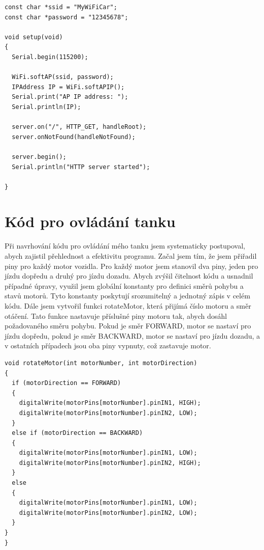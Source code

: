 \documentclass[12pt, a4paper,
oneside
openany
]{report}
\begin{document}
	\vspace*{0.1\textheight}

 \begin{lstlisting}[style=arduinoStyle]
const char *ssid = "MyWiFiCar";
const char *password = "12345678";

void setup(void)
{
  Serial.begin(115200);

  WiFi.softAP(ssid, password);
  IPAddress IP = WiFi.softAPIP();
  Serial.print("AP IP address: ");
  Serial.println(IP);

  server.on("/", HTTP_GET, handleRoot);
  server.onNotFound(handleNotFound);

  server.begin();
  Serial.println("HTTP server started");

}
\end{lstlisting}

 \newpage
\section{Kód pro ovládání tanku}
\noindent Při navrhování kódu pro ovládání mého tanku jsem systematicky postupoval, abych zajistil přehlednost a efektivitu programu. Začal jsem tím, že jsem přiřadil piny pro každý motor vozidla. Pro každý motor jsem stanovil dva piny, jeden pro jízdu dopředu a druhý pro jízdu dozadu. Abych zvýšil čitelnost kódu a usnadnil případné úpravy, využil jsem globální konstanty pro definici směrů pohybu a stavů motorů. Tyto konstanty poskytují srozumitelný a jednotný zápis v celém kódu. Dále jsem vytvořil funkci rotateMotor, která přijímá číslo motoru a směr otáčení. Tato funkce nastavuje příslušné piny motoru tak, abych dosáhl požadovaného směru pohybu. Pokud je směr FORWARD, motor se nastaví pro jízdu dopředu, pokud je směr BACKWARD, motor se nastaví pro jízdu dozadu, a v ostatních případech jsou oba piny vypnuty, což zastavuje motor.

\vspace*{0.05\textheight}

\begin{lstlisting}[style=arduinoStyle]
void rotateMotor(int motorNumber, int motorDirection)
{
  if (motorDirection == FORWARD)
  {
    digitalWrite(motorPins[motorNumber].pinIN1, HIGH);
    digitalWrite(motorPins[motorNumber].pinIN2, LOW);
  }
  else if (motorDirection == BACKWARD)
  {
    digitalWrite(motorPins[motorNumber].pinIN1, LOW);
    digitalWrite(motorPins[motorNumber].pinIN2, HIGH);
  }
  else
  {
    digitalWrite(motorPins[motorNumber].pinIN1, LOW);
    digitalWrite(motorPins[motorNumber].pinIN2, LOW);
  }
}
}
\end{lstlisting}
\end{document}

